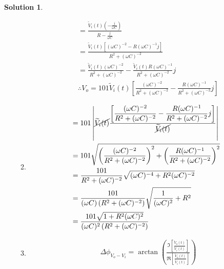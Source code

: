 \documentclass[10pt]{article}
\theoremstyle{definition}
\newtheorem{soln}{Solution}
\newcommand{\ti}[1]{\widetilde{#1}}
\begin{document}
\begin{soln}
\begin{enumerate}[label=(\alph*)]
\begin{enumerate}[label=\roman*(a).]
\begin{align*}
                     & =\frac{\ti{V}_i(t)\left(-\frac{j}{\omega C}\right)}{R-\frac{j}{\omega C}}                                                            \\
                     & =\frac{\ti{V}_i(t)\left[(\omega C)^{-2}-R(\omega C)^{-1}j\right]}{R^2+(\omega C)^{-2}}                                               \\
                     & =\frac{\ti{V}_i(t)(\omega C)^{-2}}{R^2+(\omega C)^{-2}}-\frac{\ti{V}_i(t)R(\omega C)^{-1}}{R^2+(\omega C)^{-2}}j                     \\
                     & \therefore V_o= 101\ti{V}_i(t)\left[\frac{(\omega C)^{-2}}{R^2+(\omega C)^{-2}}-\frac{R(\omega C)^{-1}}{R^2+(\omega C)^{-2}}j\right]
                  \end{align*}
            \item \begin{align*}
                     & =101\left|\cancel{\ti{V}_i(t)}\frac{\displaystyle\left[\frac{(\omega C)^{-2}}{R^2+(\omega C)^{-2}}-\frac{R(\omega C)^{-1}}{R^2+(\omega C)^{-2}}j\right]}{\cancel{\ti{V}_i(t)}}\right| \\
                     & =101\sqrt{\left(\frac{(\omega C)^{-2}}{R^2+(\omega C)^{-2}}\right)^2+\left(\frac{R(\omega C)^{-1}}{R^2+(\omega C)^{-2}}\right)^2}                                                     \\
                     & =\frac{101}{R^2+(\omega C)^{-2}}\sqrt{(\omega C)^{-4}+R^2(\omega C)^{-2}}                                                                                                             \\
                     & =\frac{101}{(\omega C)\left(R^2+(\omega C)^{-2}\right)}\sqrt{\frac{1}{(\omega C)^2}+R^2}                                                                                              \\
                     & =\frac{101\sqrt{1+R^2(\omega C)^2}}{(\omega C)^2\left(R^2+(\omega C)^{-2}\right)}                                                                                                     \\
                  \end{align*}
            \item \begin{align*}
                     & \Delta\phi_{V_o-V_i}=\arctan\left(\frac{\Im\left[\frac{\ti{V}_o(t)}{\ti{V}_i(t)}\right]}{\Re\left[\frac{\ti{V}_o(t)}{\ti{V}_i(t)}\right]}\right)                                                                                                                           \\

\end{align*}
\end{enumerate}
\end{enumerate}
\end{soln}
\end{document}
